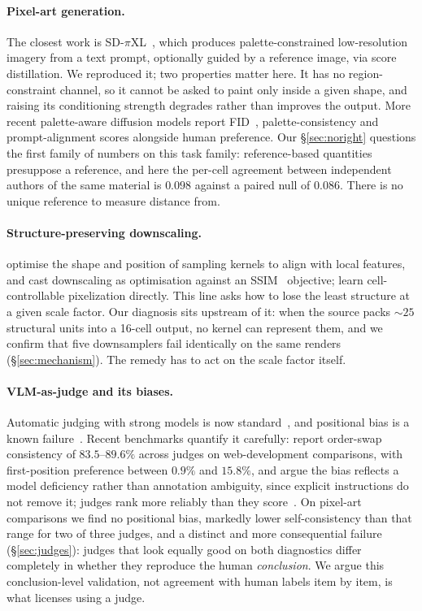 \documentclass{article}
\begin{document}
\paragraph{Pixel-art generation.} The closest work is
SD-$\pi$XL~\citep{binninger2024sdpixl}, which produces palette-constrained
low-resolution imagery from a text prompt, optionally guided by a reference
image, via score distillation. We
reproduced it; two properties matter here. It has no region-constraint
channel, so it cannot be asked to paint only inside a given shape, and
raising its conditioning strength degrades rather than improves the output.
More recent palette-aware diffusion models report FID~\citep{heusel2017fid},
palette-consistency and prompt-alignment scores alongside human preference.
Our \S\ref{sec:noright} questions the first family of numbers on this task
family: reference-based quantities presuppose a reference, and here the
per-cell agreement between independent authors of the same material is
$0.098$ against a paired null of $0.086$. There is no unique reference to
measure distance from.

\paragraph{Structure-preserving downscaling.}
\citet{kopf2013downscaling} optimise the shape and position of sampling
kernels to align with local features, and \citet{oztireli2015downscaling}
cast downscaling as optimisation against an SSIM~\citep{wang2004ssim}
objective; \citet{wu2022pixelization} learn cell-controllable pixelization
directly. This line asks how to lose the least structure at a given scale
factor. Our diagnosis sits upstream of it: when the source packs ${\sim}25$
structural units into a 16-cell output, no kernel can represent them, and we
confirm that five downsamplers fail identically on the same renders
(\S\ref{sec:mechanism}). The remedy has to act on the scale factor itself.

\paragraph{{VLM}-as-judge and its biases.} Automatic judging with strong
models is now standard~\citep{zheng2023mtbench}, and positional bias is a
known failure~\citep{wang2024fair}. Recent benchmarks quantify it carefully:
\citet{webdevjudge2025} report order-swap consistency of $83.5$--$89.6\%$
across judges on web-development comparisons, with first-position preference
between $0.9\%$ and $15.8\%$, and argue the bias reflects a model deficiency
rather than annotation ambiguity, since explicit instructions do not remove
it; judges rank more reliably than they
score~\citep{kumar2026rankscore}. On pixel-art comparisons we find no
positional bias, markedly
lower self-consistency than that range for two of three judges, and a
distinct and more consequential failure (\S\ref{sec:judges}): judges that
look equally good on both diagnostics differ completely in whether they reproduce the human
\emph{conclusion}. We argue this conclusion-level validation, not agreement
with human labels item by item, is what licenses using a judge.
\end{document}

